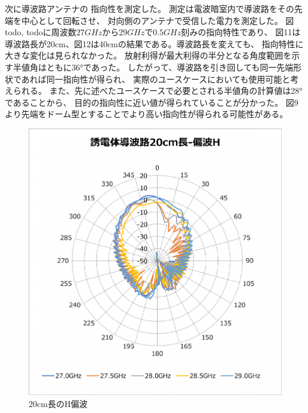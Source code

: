 \documentclass[technicalreport]{ieicej}
\begin{document}
次に導波路アンテナの
指向性を測定した。
測定は電波暗室内で導波路をその先端を中心として回転させ、
対向側のアンテナで受信した電力を測定した。
図todo, todoに周波数$27GHz$から$29GHz$で$0.5 GHz$刻みの指向特性であり、
図11は導波路長が20cm、図12は40cmの結果である。導波路長を変えても、
指向特性に大きな変化は見られなかった。
放射利得が最大利得の半分となる角度範囲を示す半値角はともに36°であった。
したがって、導波路を引き回しても同一先端形状であれば同一指向性が得られ、
実際のユースケースにおいても使用可能と考えられる。
また、先に述べたユースケースで必要とされる半値角の計算値は28°であることから、
目的の指向性に近い値が得られていることが分かった。
図9より先端をドーム型とすることでより高い指向性が得られる可能性がある。

\begin{figure}[tb]
  \begin{center}
    \includegraphics[bb=0 0 408 430, width=0.9\linewidth]{img/waveguide-20cm-h.pdf}
    \caption{20cm長のH偏波}
    \label{fig:20cm-h}
  \end{center}
\end{figure}
\end{document}
